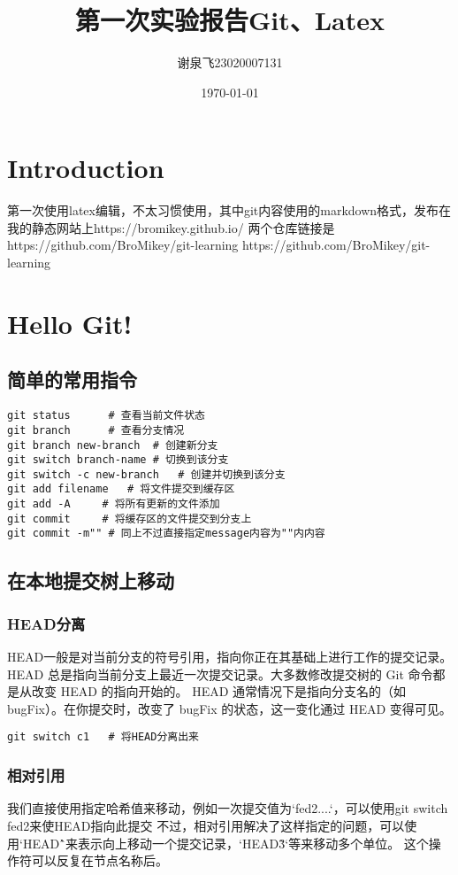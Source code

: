 \documentclass{article}
\begin{document}
	
	\title{第一次实验报告Git、Latex}
	\author{谢泉飞23020007131}
	\date{\today} %
	\maketitle
	
	\tableofcontents
	\newpage
	
	
	\section{Introduction}
	第一次使用latex编辑，不太习惯使用，其中git内容使用的markdown格式，发布在我的静态网站上https://bromikey.github.io/
	两个仓库链接是https://github.com/BroMikey/git-learning    https://github.com/BroMikey/git-learning
	
	
	\section{Hello Git!}
	\subsection{简单的常用指令}
		\begin{lstlisting}
git status      # 查看当前文件状态
git branch      # 查看分支情况
git branch new-branch  # 创建新分支
git switch branch-name # 切换到该分支
git switch -c new-branch   # 创建并切换到该分支
git add filename   # 将文件提交到缓存区
git add -A     # 将所有更新的文件添加
git commit     # 将缓存区的文件提交到分支上
git commit -m""	# 同上不过直接指定message内容为""内内容
		\end{lstlisting}
	\subsection{在本地提交树上移动}
		\subsubsection{HEAD分离}
			HEAD一般是对当前分支的符号引用，指向你正在其基础上进行工作的提交记录。HEAD 总是指向当前分支上最近一次提交记录。大多数修改提交树的 Git 命令都是从改变 HEAD 的指向开始的。
			HEAD 通常情况下是指向分支名的（如 bugFix）。在你提交时，改变了 bugFix 的状态，这一变化通过 HEAD 变得可见。
			\begin{lstlisting}
git switch c1	# 将HEAD分离出来
			\end{lstlisting}
		\subsubsection{相对引用}
			我们直接使用指定哈希值来移动，例如一次提交值为`fed2....`，可以使用git switch fed2来使HEAD指向此提交
			不过，相对引用解决了这样指定的问题，可以使用`HEAD\^`来表示向上移动一个提交记录，`HEAD\~3`等来移动多个单位。
			这个操作符可以反复在节点名称后。
			
\end{document}
